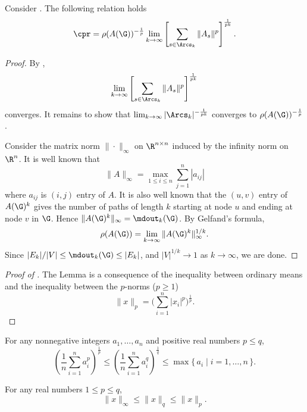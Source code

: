 \begin{lemma}
  \label{lem:rhoAG}
  Consider .
  The following relation holds
  \[
    \cpr = \rho(A(\G))^{-\frac{1}{p}} \lim_{k \to \infty}
    \left[
      \sum_{s \in \Arcs_k} \|A_s\|^p
    \right]^{\frac{1}{pk}}.
  \]
  \begin{proof}
    By ,
    \[
      \lim_{k \to \infty}
      \left[
        \sum_{s \in \Arcs_k} \|A_s\|^p
      \right]^{\frac{1}{pk}}
    \]
    converges.
    It remains to show that $\lim_{k \to \infty} |\Arcs_k|^{-\frac{1}{pk}}$ converges to $\rho(A(\G))^{-\frac{1}{p}}$.

    Consider the matrix norm $\|\cdot\|_\infty$ on $\R^{n \times n}$ induced by the infinity norm on $\R^n$.
    It is well known that
    \[ \|A\|_{\infty} = \max_{1 \leq i \leq n} \sum_{j=1}^n |a_{ij}| \]
    where $a_{ij}$ is $(i,j)$ entry of $A$.
    It is also well known that the $(u,v)$ entry of $A(\G)^k$ gives                        %
    the number of paths of length $k$ starting at node $u$ and ending at node $v$ in $\G$. %
    Hence $\|A(\G)^k\|_\infty = \mdout_k(\G)$.
    By Gelfand's formula,
    \begin{equation}
      \label{eq:rhoAG}
      \rho(A(\G)) = \lim_{k \to \infty} \|A(\G)^k\|_\infty^{1/k}.
    \end{equation}
    Since $|E_k|/|V| \leq \mdout_k(\G) \leq |E_k|$,
    and $|V|^{1/k} \to 1$ as $k \to \infty$, we are done.
  \end{proof}
\end{lemma}



\begin{proof}[Proof of ]
  The Lemma is a consequence of the inequality between ordinary means
  and the inequality between the $p$-norms ($p \geq 1$)
  \[ \|x\|_p = \Big(\sum_{i=1}^n |x_i|^p\Big)^{\frac{1}{p}}. \]
\end{proof}

\begin{lemma}
  For any nonnegative integers $a_1, \ldots, a_n$ and positive
  real numbers $p \leq q$,
  \[
    \left(\frac{1}{n}\sum_{i=1}^n a_i^p\right)^{\frac{1}{p}}
    \leq
    \left(\frac{1}{n}\sum_{i=1}^n a_i^q\right)^{\frac{1}{q}}
    \leq \max\{\, a_i \mid i = 1, \ldots, n\,\}.
  \]
\end{lemma}

\begin{lemma}
  For any real numbers $1 \leq p \leq q$,
  \[
    \|x\|_\infty \leq \|x\|_q \leq \|x\|_p.
  \]
\end{lemma}


